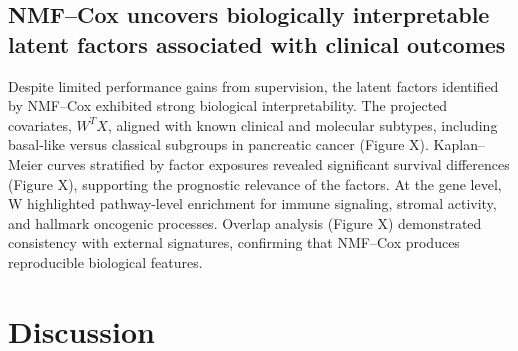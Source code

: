 \documentclass[9pt,twocolumn,twoside,]{pnas-new}
\begin{document}
\subsection{NMF--Cox uncovers biologically interpretable latent factors
associated with clinical
outcomes}\label{nmfcox-uncovers-biologically-interpretable-latent-factors-associated-with-clinical-outcomes}

Despite limited performance gains from supervision, the latent factors
identified by NMF--Cox exhibited strong biological interpretability. The
projected covariates, \(W^TX\), aligned with known clinical and
molecular subtypes, including basal-like versus classical subgroups in
pancreatic cancer (Figure X). Kaplan--Meier curves stratified by factor
exposures revealed significant survival differences (Figure X),
supporting the prognostic relevance of the factors. At the gene level, W
highlighted pathway-level enrichment for immune signaling, stromal
activity, and hallmark oncogenic processes. Overlap analysis (Figure X)
demonstrated consistency with external signatures, confirming that
NMF--Cox produces reproducible biological features.

\section*{Discussion}\label{discussion}

\showmatmethods
\showacknow
\pnasbreak



% 
\end{document}
